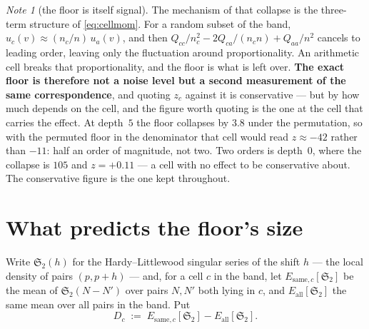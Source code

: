 \documentclass[11pt,a4paper]{article}
\theoremstyle{plain}
\theoremstyle{definition}
\theoremstyle{remark}
\newtheorem{note}[theorem]{Note}
\renewcommand{\SS}{\mathfrak{S}}
\begin{document}
\begin{note}[the floor is itself signal]\label{note:floorsignal}
The mechanism of that collapse is the three-term structure of
\eqref{eq:cellmom}. For a random subset of the band,
$u_c(v)\approx(n_c/n)\,u_a(v)$, and then
$Q_{cc}/n_c^2-2Q_{ca}/(n_cn)+Q_{aa}/n^2$ cancels to leading order,
leaving only the fluctuation around proportionality. An arithmetic
cell breaks that proportionality, and the floor is what is left over.
\textbf{The exact floor is therefore not a noise level but a second
measurement of the same correspondence}, and quoting $z_c$ against it
is conservative --- but by how much depends on the cell, and the
figure worth quoting is the one at the cell that carries the effect.
At depth~$5$ the floor collapses by $3.8$ under the permutation, so
with the permuted floor in the denominator that cell would read
$z\approx-42$ rather than $-11$: half an order of magnitude, not two.
Two orders is depth~$0$, where the collapse is $105$ and $z=+0.11$ ---
a cell with no effect to be conservative about. The conservative figure
is the one kept throughout.
\end{note}

\section{What predicts the floor's size}\label{sec:size}

Write $\SS_2(h)$ for the Hardy--Littlewood singular series of the
shift $h$ --- the local density of pairs $(p,p+h)$ --- and, for a cell
$c$ in the band, let $E_{\mathrm{same},c}[\SS_2]$ be the mean of
$\SS_2(N-N')$ over pairs $N,N'$ both lying in $c$, and
$E_{\mathrm{all}}[\SS_2]$ the same mean over all pairs in the band.
Put
\begin{equation}\label{eq:Dc}
  D_c\;:=\;E_{\mathrm{same},c}[\SS_2]-E_{\mathrm{all}}[\SS_2].
\end{equation}
\end{document}
